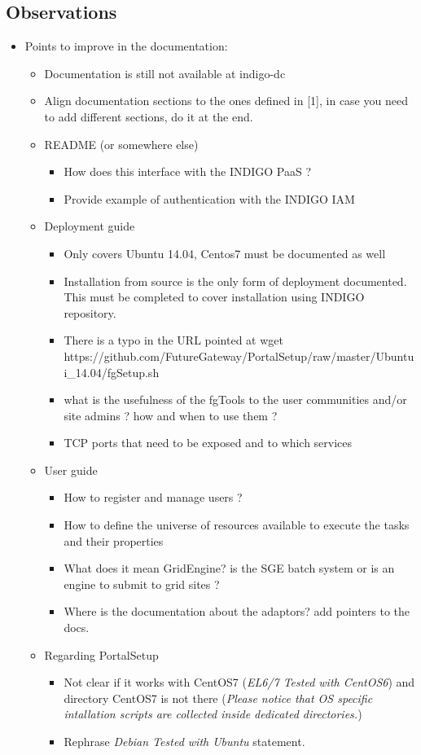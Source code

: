 \documentclass[a4wide,11pt]{article}
\begin{document}
\subsection{Observations}
\begin{itemize}
        \item Points to improve in the documentation: \begin{itemize} \item Documentation is still not available at indigo-dc \item Align documentation sections to the ones defined in [1], in case you need to add different sections, do it at the end. \item README (or somewhere else) \begin{itemize} \item How does this interface with the INDIGO PaaS ? \item Provide example of authentication with the INDIGO IAM \end{itemize} \item Deployment guide \begin{itemize} \item Only covers Ubuntu 14.04, Centos7 must be documented as well \item Installation from source is the only form of deployment documented. This must be completed to cover installation using INDIGO repository. \item There is a typo in the URL pointed at wget https://github.com/FutureGateway/PortalSetup/raw/master/Ubuntui\_14.04/fgSetup.sh \item what is the usefulness of the fgTools to the user communities and/or site admins ? how and when to use them ? \item TCP ports that need to be exposed and to which services \end{itemize} \item User guide \begin{itemize} \item How to register and manage users ? \item How to define the universe of resources available to execute the tasks and their properties \item What does it mean GridEngine? is the SGE batch system or is an engine to submit to grid sites ? \item Where is the documentation about the adaptors? add pointers to the docs. \end{itemize} \item Regarding PortalSetup \begin{itemize} \item Not clear if it works with CentOS7 (\textit{EL6/7 Tested with CentOS6}) and directory CentOS7 is not there (\textit{Please notice that OS specific intallation scripts are collected inside dedicated directories.}) \item Rephrase \textit{Debian Tested with Ubuntu} statement. \end{itemize} \end{itemize}
    \end{itemize}
\end{document}
